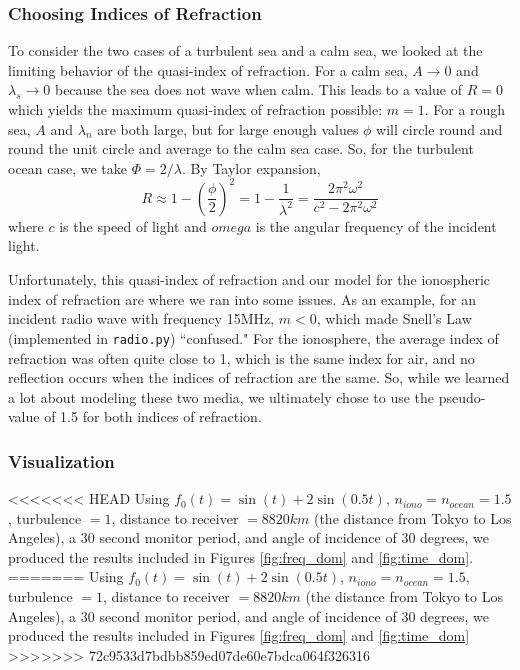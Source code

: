 \documentclass[11pt]{article}
\numberwithin{equation}{section}
\begin{document}
\subsubsection{Choosing Indices of Refraction}
To consider the two cases of a turbulent sea and a calm sea, we looked at the limiting behavior of the quasi-index of refraction. For a calm sea, $A \to 0$ and $\lambda_s \to 0$ because the sea does not wave when calm. This leads to a value of $R=0$ which yields the maximum quasi-index of refraction possible: $m=1$. For a rough sea, $A$ and $\lambda_n$ are both large, but for large enough values $\phi$ will circle round and round the unit circle and average to the calm sea case. So, for the turbulent ocean case, we take $\Phi=2/\lambda$. By Taylor expansion, 
\begin{equation}
R \approx 1 - \left(\frac{\phi}{2}\right)^2 = 1 - \frac{1}{\lambda^2} = \frac{2\pi^2\omega^2}{c^2 - 2\pi^{2}\omega^2}
\end{equation}
where $c$ is the speed of light and $omega$ is the angular frequency of the incident light. 
\par Unfortunately, this quasi-index of refraction and our model for the ionospheric index of refraction are where we ran into some issues. As an example, for an incident radio wave with frequency 15\si{\mega \Hz}, $m < 0$, which made Snell's Law (implemented in \verb|radio.py|) ``confused." For the ionosphere, the average index of refraction was often quite close to 1, which is the same index for air, and no reflection occurs when the indices of refraction are the same. So, while we learned a lot about modeling these two media, we ultimately chose to use the pseudo-value of 1.5 for both indices of refraction.

\subsubsection{Visualization}
<<<<<<< HEAD
Using $f_{0}(t) = \sin(t) + 2\sin(0.5t)$, $n_{iono} = n_{ocean}  = 1.5$, turbulence $=1$, distance to receiver $=8820 \si{km}$ (the distance from Tokyo to Los Angeles), a 30 second monitor period, and angle of incidence of 30 degrees, we produced the results included in Figures \ref{fig:freq_dom} and \ref{fig:time_dom}.
=======
\label{ssub:visualization}
Using $f_{0}(t) = \sin(t) + 2\sin(0.5t)$, $n_{iono} = n_{ocean}  = 1.5$, turbulence $=1$, distance to receiver $=8820 km$ (the distance from Tokyo to Los Angeles), a 30 second monitor period, and angle of incidence of 30 degrees, we produced the results included in Figures \ref{fig:freq_dom} and \ref{fig:time_dom}
>>>>>>> 72c9533d7bdbb859ed07de60e7bdca064f326316
\end{document}
